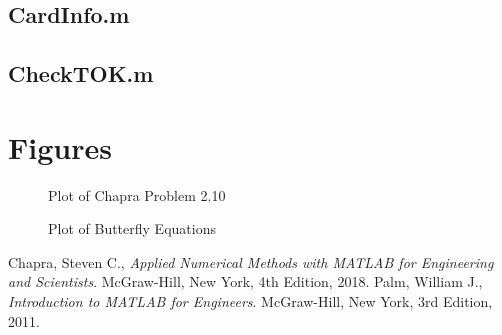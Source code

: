 \documentclass{article}
\begin{document}
\pagebreak

\subsection{CardInfo.m}

\pagebreak

\subsection{CheckTOK.m}
\clearpage %

\section{Figures}


\begin{figure}[ht!]
\begin{center}
\caption{Plot of Chapra Problem 2.10}
\end{center}
\end{figure}

\begin{figure}[ht!]
\begin{center}
\caption{Plot of Butterfly Equations}
\end{center}
\end{figure}
\clearpage %

\begin{thebibliography}{9}
  Chapra, Steven C.,
  {\it Applied Numerical Methods with MATLAB for Engineering and Scientists}.
  McGraw-Hill, New York,
  4th Edition,
  2018.
  Palm, William J.,
  {\it Introduction to MATLAB for Engineers}.
  McGraw-Hill, New York,
  3rd Edition,
  2011.
\end{thebibliography}
\end{document}
